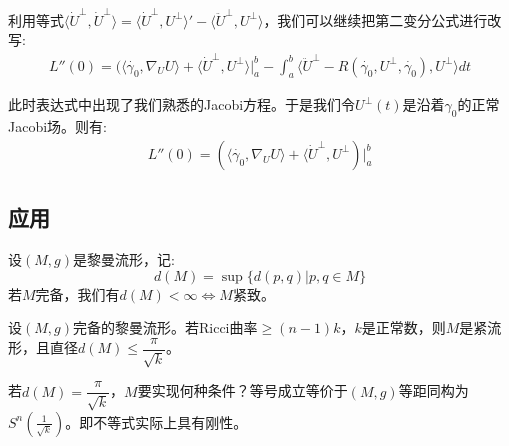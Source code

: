 利用等式$\langle \dot{U}^{\bot},\dot{U}^{\bot}\rangle=\langle \dot{U}^{\bot},U^{\bot}\rangle'-\langle \ddot{U}^{\bot},U^{\bot}\rangle$，我们可以继续把第二变分公式进行改写:
\begin{align*}
    L''(0)=(\langle \dot{\gamma_0},\nabla_U U\rangle+\langle \dot{U}^{\bot},U^{\bot}\rangle|_a^b -\int_a^b \langle \ddot{U}^{\bot}-R(\dot{\gamma_0},U^{\bot},\dot{\gamma_0}),U^{\bot}\rangle dt
\end{align*}

此时表达式中出现了我们熟悉的Jacobi方程。于是我们令$U^{\bot}(t)$是沿着$\gamma_0$的正常Jacobi场。则有:
\begin{align*}
    L''(0)=(\langle \dot{\gamma_0},\nabla_U U\rangle+\langle \dot{U}^{\bot},U^{\bot})|_a^b
\end{align*}
\subsection{应用}
\begin{definition}[直径]
    设$(M,g)$是黎曼流形，记:
    $$
    d(M)=\sup\{d(p,q)|p,q \in M\}
    $$
    若$M$完备，我们有$d(M)<\infty \Leftrightarrow M$紧致。
\end{definition}
\begin{theorem}
    设$(M,g)$完备的黎曼流形。若Ricci曲率$\geq (n-1)k$，$k$是正常数，则$M$是紧流形，且直径$d(M)\leq \dfrac{\pi}{\sqrt{k}}$。
\end{theorem}
若$d(M)=\dfrac{\pi}{\sqrt{k}}$，$M$要实现何种条件？等号成立等价于$(M,g)$等距同构为$S^n(\frac{1}{\sqrt{k}})$。即不等式实际上具有刚性。
